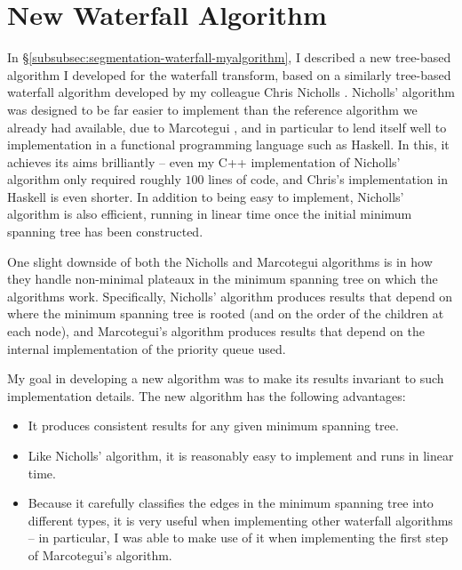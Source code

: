 \section{New Waterfall Algorithm}

In \S\ref{subsubsec:segmentation-waterfall-myalgorithm}, I described a new tree-based algorithm I developed for the waterfall transform, based on a similarly tree-based waterfall algorithm developed by my colleague Chris Nicholls \cite{nicholls09}. Nicholls' algorithm was designed to be far easier to implement than the reference algorithm we already had available, due to Marcotegui \cite{marcotegui05}, and in particular to lend itself well to implementation in a functional programming language such as Haskell. In this, it achieves its aims brilliantly -- even my C++ implementation of Nicholls' algorithm only required roughly $100$ lines of code, and Chris's implementation in Haskell is even shorter. In addition to being easy to implement, Nicholls' algorithm is also efficient, running in linear time once the initial minimum spanning tree has been constructed.

One slight downside of both the Nicholls and Marcotegui algorithms is in how they handle non-minimal plateaux in the minimum spanning tree on which the algorithms work. Specifically, Nicholls' algorithm produces results that depend on where the minimum spanning tree is rooted (and on the order of the children at each node), and Marcotegui's algorithm produces results that depend on the internal implementation of the priority queue used.

My goal in developing a new algorithm was to make its results invariant to such implementation details. The new algorithm has the following advantages:
%
\begin{itemize}
\item It produces consistent results for any given minimum spanning tree.
\item Like Nicholls' algorithm, it is reasonably easy to implement and runs in linear time.
\item Because it carefully classifies the edges in the minimum spanning tree into different types, it is very useful when implementing other waterfall algorithms -- in particular, I was able to make use of it when implementing the first step of Marcotegui's algorithm.
\end{itemize}

